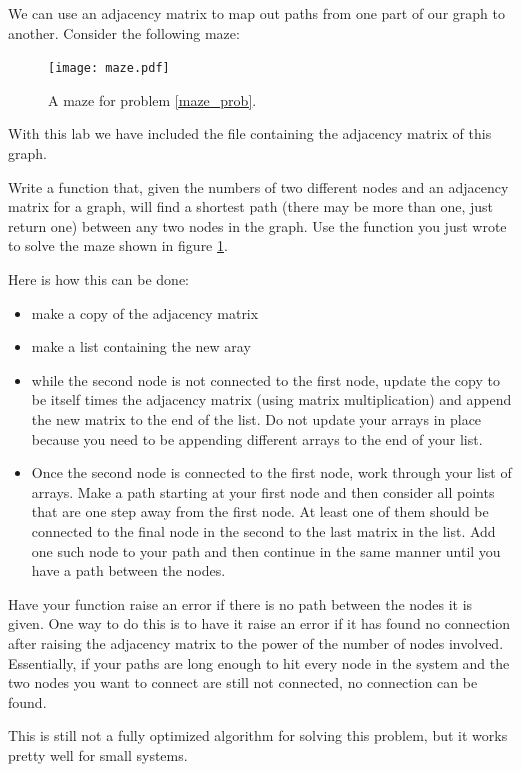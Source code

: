 We can use an adjacency matrix to map out paths from one part of our graph to another.
Consider the following maze:

\begin{figure}
\texttt{[image: maze.pdf]}
\caption{A maze for problem \ref{maze_prob}.}
\label{maze_fig}
\end{figure}

With this lab we have included the file  containing the adjacency matrix of this graph.

\begin{problem} \label{maze_prob}
Write a function that, given the numbers of two different nodes and an adjacency matrix for a graph, will find a shortest path (there may be more than one, just return one) between any two nodes in the graph.
Use the function you just wrote to solve the maze shown in figure \ref{maze_fig}.

Here is how this can be done:
\begin{itemize}
\item make a copy of the adjacency matrix
\item make a list containing the new aray
\item while the second node is not connected to the first node, update the copy to be itself times the adjacency matrix (using matrix multiplication) and append the new matrix to the end of the list.
Do not update your arrays in place because you need to be appending different arrays to the end of your list.
\item Once the second node is connected to the first node, work through your list of arrays. 
Make a path starting at your first node and then consider all points that are one step away from the first node.
At least one of them should be connected to the final node in the second to the last matrix in the list.
Add one such node to your path and then continue in the same manner until you have a path between the nodes.
\end{itemize}

Have your function raise an error if there is no path between the nodes it is given.
One way to do this is to have it raise an error if it has found no connection after raising the adjacency matrix to the power of the number of nodes involved.
Essentially, if your paths are long enough to hit every node in the system and the two nodes you want to connect are still not connected, no connection can be found.

This is still not a fully optimized algorithm for solving this problem, but it works pretty well for small systems.
\end{problem}

